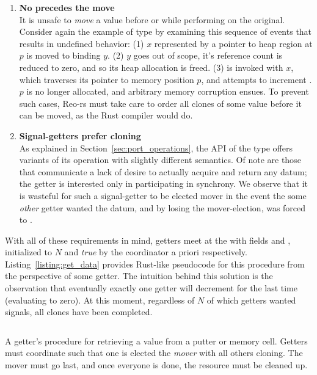 \begin{enumerate}
	\item \textbf{No  precedes the move}\\
	 It is unsafe to \textit{move} a value before or while performing  on the original. Consider again the example of type  by examining this sequence of events that results in undefined behavior: (1)  $x$ represented by a pointer to heap region at $p$ is moved to binding $y$. (2) $y$ goes out of scope, it's reference count is reduced to zero, and so its heap allocation is freed. (3)  is invoked with $x$, which traverses its pointer to memory position $p$, and attempts to increment . $p$ is no longer allocated, and arbitrary memory corruption ensues. To prevent such cases, Reo-rs must take care to order all clones of some value before it can be moved, as the Rust compiler would do.
	 
	 \item \textbf{Signal-getters prefer cloning}\\
	 As explained in Section~\ref{sec:port_operations}, the API of the  type offers variants of its  operation with slightly different semantics. Of note are those that communicate a lack of desire to actually acquire and return any datum; the getter is interested only in participating in synchrony. We observe that it is wasteful for such a signal-getter to be elected mover in the event the some \textit{other} getter wanted the datum, and by losing the mover-election, was forced to .
\end{enumerate}

With all of these requirements in mind, getters meet at the  with fields  and , initialized to $N$ and \textit{true} by the coordinator a priori respectively. Listing~\ref{listing:get_data} provides Rust-like pseudocode for this procedure from the perspective of some getter. The intuition behind this solution is the observation that eventually exactly one getter will decrement  for the last time (evaluating  to zero). At this moment, regardless of $N$ of which getters wanted signals, all clones have been completed. 

\begin{listing}[ht]
	\centering
	\inputminted{rust}{get_data.rs}
	\caption[Getter procedure for acquiring resource data.]{A getter's procedure for retrieving a value from a putter or memory cell. Getters must coordinate such that one is elected the \textit{mover} with all others cloning. The mover must go last, and once everyone is done, the resource must be cleaned up.}
	\label{listing:get_data}
\end{listing}


